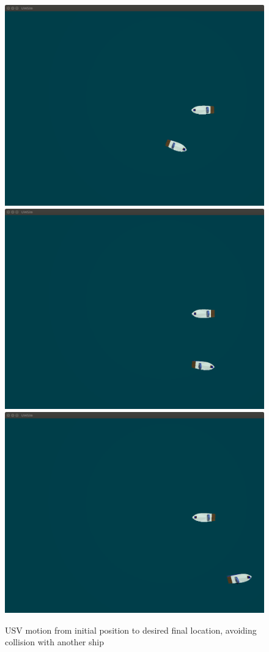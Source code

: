 \begin{figure}[H]
        \includegraphics[scale=0.2]{figs/Experiment_HeadOn_5.png}\\
        \includegraphics[scale=0.2]{figs/Experiment_HeadOn_6.png}
        \includegraphics[scale=0.2]{figs/Experiment_HeadOn_7.png}
        \caption{USV motion from initial position to desired final location, avoiding collision with another ship}
        \label{fig:Experiment_HeadOn_Sequence}
    \end{figure}
    
